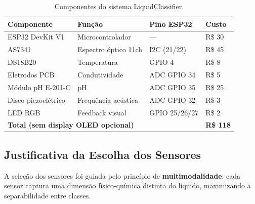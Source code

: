 \documentclass[12pt, a4paper]{article}
\begin{document}
\begin{table}[H]
  \centering
  \caption{Componentes do sistema LiquidClassifier.}
  \label{tab:componentes}
  \begin{tabular}{llll}
    \toprule
    \textbf{Componente} & \textbf{Fun\c{c}\~{a}o} & \textbf{Pino ESP32} & \textbf{Custo} \\
    \midrule
    ESP32 DevKit V1     & Microcontrolador       & ---           & R\$ 30 \\
    AS7341              & Espectro \'{o}ptico 11ch   & I2C (21/22)   & R\$ 45 \\
    DS18B20             & Temperatura            & GPIO 4        & R\$ 8 \\
    Eletrodos PCB       & Condutividade          & ADC GPIO 34   & R\$ 5 \\
    M\'{o}dulo pH E-201-C   & pH                     & ADC GPIO 35   & R\$ 25 \\
    Disco piezoel\'{e}trico & Frequ\^{e}ncia ac\'{u}stica   & ADC GPIO 32   & R\$ 3 \\
    LED RGB             & Feedback visual        & GPIO 25/26/27 & R\$ 2 \\
    \midrule
    \multicolumn{3}{l}{\textbf{Total (sem display OLED opcional)}} & \textbf{R\$ 118} \\
    \bottomrule
  \end{tabular}
\end{table}

\subsection{Justificativa da Escolha dos Sensores}

A sele\c{c}\~{a}o dos sensores foi guiada pelo princ\'{i}pio de \textbf{multimodalidade}: cada sensor captura uma dimens\~{a}o f\'{i}sico-qu\'{i}mica distinta do l\'{i}quido, maximizando a separabilidade entre classes.
\end{document}
